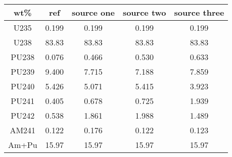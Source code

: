 	\begin{tabular}{ccccc}
		\hline
		\textbf{wt\%} & \textbf{ref} & \textbf{source one} & \textbf{source two} & \textbf{source three} \\ 
		\hline
		U235 & 0.199 & 0.199 & 0.199 & 0.199 \\ 
		U238 & 83.83 & 83.83 & 83.83 & 83.83 \\ 
		PU238 & 0.076 & 0.466 & 0.530 & 0.633 \\ 
		PU239 & 9.400 & 7.715 & 7.188 & 7.859 \\ 
		PU240 & 5.426 & 5.071 & 5.415 & 3.923 \\ 
		PU241 & 0.405 & 0.678 & 0.725 & 1.939 \\ 
		PU242 & 0.538 & 1.861 & 1.988 & 1.489 \\ 
		AM241 & 0.122 & 0.176 & 0.122 & 0.123 \\ 
		Am+Pu & 15.97 & 15.97 & 15.97 & 15.97 \\ 
		\hline 
	\end{tabular} 
